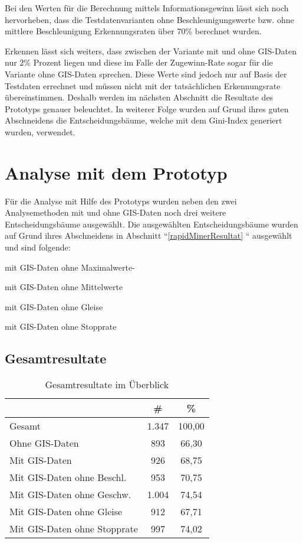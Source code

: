 Bei den Werten für die Berechnung mittels Informationsgewinn lässt sich noch hervorheben, dass die Testdatenvarianten ohne Beschleunigungswerte bzw. ohne mittlere Beschleunigung Erkennungsraten über 70\% berechnet wurden. 

Erkennen lässt sich weiters, dass zwischen der Variante mit und ohne GIS-Daten nur 2\% Prozent liegen und diese im Falle der Zugewinn-Rate sogar für die Variante ohne GIS-Daten sprechen. Diese Werte sind jedoch nur auf Basis der Testdaten errechnet und müssen nicht mit der tatsächlichen Erkennungsrate übereinstimmen. Deshalb werden im nächsten Abschnitt die Resultate des Prototyps genauer beleuchtet. In weiterer Folge wurden auf Grund ihres guten Abschneidens die Entscheidungsbäume, welche mit dem Gini-Index generiert wurden, verwendet.

\section{Analyse mit dem Prototyp}
Für die Analyse mit Hilfe des Prototyps wurden neben den zwei Analysemethoden mit und ohne GIS-Daten noch drei weitere Entscheidungsbäume ausgewählt. Die ausgewählten Entscheidungsbäume wurden auf Grund ihres Abschneidens in Abschnitt ``\ref{rapidMinerResultat} `` ausgewählt und sind folgende:

\begin{pitemize}
\item mit GIS-Daten ohne Maximalwerte-
\item mit GIS-Daten ohne Mittelwerte
\item mit GIS-Daten ohne Gleise
\item mit GIS-Daten ohne Stopprate
\end{pitemize}

\subsection{Gesamtresultate}

\begin{table}[h]
\centering
\begin{tabular}{|l|c|c|}
\hline
 & \# & \% \\ \hline
Gesamt & 1.347 & 100,00 \\ \hline
Ohne GIS-Daten & 893 & 66,30 \\ \hline
Mit GIS-Daten & 926 & 68,75 \\ \hline
Mit GIS-Daten ohne Beschl. & 953 & 70,75 \\ \hline
Mit GIS-Daten ohne Geschw. & 1.004 & 74,54 \\ \hline
Mit GIS-Daten ohne Gleise & 912 & 67,71 \\ \hline
Mit GIS-Daten ohne Stopprate & 997 & 74,02 \\ \hline
\end{tabular}
\caption{Gesamtresultate im Überblick}
\label{my-label}
\end{table}

